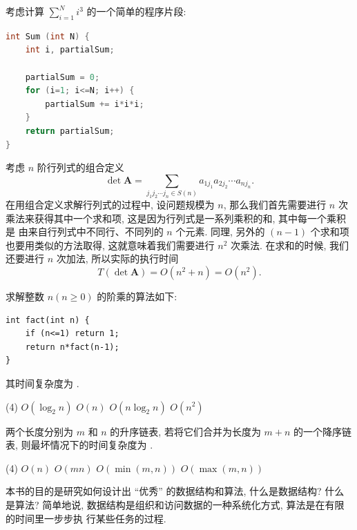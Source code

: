 \documentclass[10pt,UTF8]{book} %
\begin{document}
\newpage
\begin{example}
    考虑计算 $\sum_{i=1}^N i^3$ 的一个简单的程序片段:
    \begin{lstlisting}[language=C]
int Sum (int N) {
    int i, partialSum;

    partialSum = 0;
    for (i=1; i<=N; i++) {
        partialSum += i*i*i;
    }
    return partialSum;
}
    \end{lstlisting}
\end{example}

\newpage

\begin{example}
    考虑 $n$ 阶行列式的组合定义
    \[ \det \boldsymbol{A} = \sum_{j_1 j _2 \cdots j_n \in S(n)}
    a_{1 j_1}a_{2 j_2} \cdots a_{n j_n}. \]
    在用组合定义求解行列式的过程中, 设问题规模为 $n$, 那么我们首先需要进行
    $n$ 次乘法来获得其中一个求和项, 这是因为行列式是一系列乘积的和, 其中每一个乘积是
    由来自行列式中不同行、不同列的 $n$ 个元素. 同理, 另外的 $(n-1)$ 个求和项
    也要用类似的方法取得, 这就意味着我们需要进行 $n^2$ 次乘法. 在求和的时候,
    我们还要进行 $n$ 次加法, 所以实际的执行时间
    \[ T(\det \boldsymbol{A}) = O(n^2 + n) = O(n^2). \]
\end{example}

\begin{example}
    求解整数 $n (n \geqslant 0)$ 的阶乘的算法如下:
    \begin{lstlisting}
int fact(int n) {
    if (n<=1) return 1;
    return n*fact(n-1);
}
    \end{lstlisting}
    其时间复杂度为 \underline{\qquad \qquad \qquad}.
    \begin{tasks}[label={\Alph*.}](4)
        \task $O(\log_2 n)$
        \task $O(n)$
        \task $O(n\log_2 n)$
        \task $O(n^2)$
    \end{tasks}
\end{example}

\begin{example}
    两个长度分别为 $m$ 和 $n$ 的升序链表, 若将它们合并为长度为 $m+n$ 的一个降序链表,
    则最坏情况下的时间复杂度为 \underline{\qquad \qquad \qquad}.
    \begin{tasks}[label={\Alph*.}](4)
        \task $O(n)$
        \task $O(mn)$
        \task $O(\min(m,n))$
        \task $O(\max(m,n))$
    \end{tasks}
\end{example}

本书的目的是研究如何设计出 “优秀” 的数据结构和算法, 什么是数据结构? 什么是算法?
简单地说, 数据结构是组织和访问数据的一种系统化方式, 算法是在有限的时间里一步步执
行某些任务的过程.
\end{document}
